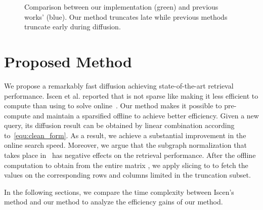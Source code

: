 \documentclass[letterpaper]{article} \usepackage{aaai19}  \usepackage{times}  \usepackage{helvet}  \usepackage{courier}  \usepackage{url}  \usepackage{graphicx}  \frenchspacing  \setlength{\pdfpagewidth}{8.5in}  \setlength{\pdfpageheight}{11in}
\begin{document}
\begin{figure}[t]
\centering
{}
\caption{Comparison between our implementation (green) and previous works' (blue). Our method truncates late while previous methods truncate early during diffusion.}
\label{fig:trunc_order}
\vspace{-3mm}
\end{figure}


\section{Proposed Method}

We propose a remarkably fast diffusion achieving state-of-the-art retrieval performance.
Iscen et al. reported that  is not sparse like  making it less efficient to compute than using  to solve  online~\cite{iscen2017efficient}.
Our method makes it possible to pre-compute and maintain a sparsified  offline to achieve better efficiency.
Given a new query, its diffusion result can be obtained by linear combination according to~\cref{equ:clean_form}.
As a result, we achieve a substantial improvement in the online search speed.
Moreover, we argue that the subgraph normalization that takes place in~\cite{iscen2017efficient} has negative effects on the retrieval performance.
After the offline computation to obtain  from the entire matrix , we apply slicing to  to fetch the values on the corresponding rows and columns limited in the truncation subset.


In the following sections, we compare the time complexity between Iscen's method and our method to analyze the efficiency gains of our method.
\end{document}
